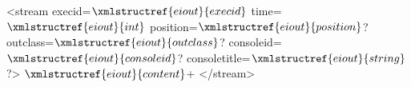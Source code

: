 <stream execid=$\xmlstructref{eiout}{execid}$ time=$\xmlstructref{eiout}{int}$ position=$\xmlstructref{eiout}{position}$? outclass=$\xmlstructref{eiout}{outclass}$? consoleid=$\xmlstructref{eiout}{consoleid}$? consoletitle=$\xmlstructref{eiout}{string}$?>
  $\xmlstructref{eiout}{content}$+
</stream>
